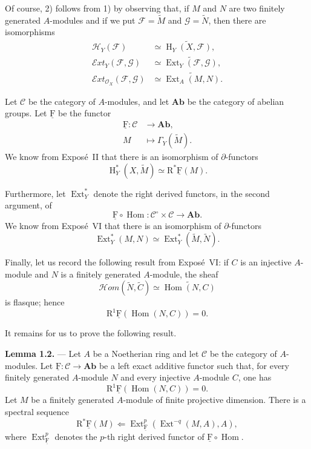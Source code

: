 \documentclass[10pt,a4paper]{article}
\newcommand{\OX}{\mathcal O_X}
\newcommand{\Ab}{\mathbf{Ab}}
\newcommand{\CatC}{\mathcal C}
\newcommand{\uF}{\underline{\mathrm F}}
\newcommand{\cF}{\uF}
\newcommand{\Hloc}{\operatorname H}
\newcommand{\Ext}{\operatorname{Ext}}
\newcommand{\SheafExt}{\mathcal E\!xt}
\newcommand{\SheafHom}{\mathcal H\!om}
\newcommand{\SheafH}{\mathcal H}
\newcommand{\R}{\mathrm R}
\theoremstyle{sgatheorem}
\theoremstyle{plain}
\numberwithin{equation}{section}
\begin{document}

\let\cF\uF

Of course, 2) follows from 1) by observing that, if $M$ and $N$ are two
finitely generated $A$-modules and if we put $\mathcal F=\widetilde M$ and
$\mathcal G=\widetilde N$, then there are isomorphisms
\begin{align*}
  \SheafH_Y(\mathcal F)
    &\simeq \widetilde{\Hloc_Y(X,\mathcal F)}, \\
  \SheafExt_Y(\mathcal F,\mathcal G)
    &\simeq \widetilde{\Ext_Y(\mathcal F,\mathcal G)}, \\
  \SheafExt_{\OX}(\mathcal F,\mathcal G)
    &\simeq \widetilde{\Ext_A(M,N)}.
\end{align*}

Let $\CatC$ be the category of $A$-modules, and let $\Ab$ be the category of
abelian groups. Let $\cF$ be the functor
\[
  \begin{aligned}
    \cF\colon \CatC &\longrightarrow \Ab, \\
    M &\longmapsto \Gamma_Y(\widetilde M).
  \end{aligned}
\]
We know from Expos\'e~II that there is an isomorphism of $\partial$-functors
\[
  \Hloc_Y^*(X,\widetilde M)\simeq \R^*\cF(M).
\]

Furthermore, let $\Ext_Y^*$ denote the right derived functors, in the second
argument, of
\[
  \cF\circ\operatorname{Hom}\colon \CatC^{\circ}\times\CatC\longrightarrow\Ab.
\]
We know from Expos\'e~VI that there is an isomorphism of $\partial$-functors
\[
  \Ext_Y^*(M,N)\simeq \Ext_Y^*(\widetilde M,\widetilde N).
\]

Finally, let us record the following result from Expos\'e~VI: if $C$ is an
injective $A$-module and $N$ is a finitely generated $A$-module, the sheaf
\[
  \SheafHom(\widetilde N,\widetilde C)
    \simeq \widetilde{\operatorname{Hom}(N,C)}
\]
is flasque; hence
\[
  \R^1\cF(\operatorname{Hom}(N,C))=0.
\]


It remains for us to prove the following result.

\medskip
\noindent\textbf{Lemma 1.2.} --- Let $A$ be a Noetherian ring and let $\CatC$
be the category of $A$-modules. Let
$\cF\colon\CatC\longrightarrow\Ab$ be a left exact additive functor such that,
for every finitely generated $A$-module $N$ and every injective $A$-module
$C$, one has
\[
  \R^1\cF(\operatorname{Hom}(N,C))=0.
\]
Let $M$ be a finitely generated $A$-module of finite projective dimension.
There is a spectral sequence
\[
  \R^\ast\cF(M)
    \Longleftarrow
  \Ext_{\cF}^{p}(\Ext^{-q}(M,A),A),
\]
where $\Ext_{\cF}^{p}$ denotes the $p$-th right derived functor of
$\cF\circ\operatorname{Hom}$.
\end{document}
